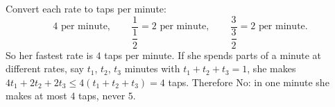 Convert each rate to taps per minute:
\[4\text{ per minute},\qquad \dfrac{1}{\dfrac12}=2\text{ per minute},\qquad \dfrac{3}{\dfrac32}=2\text{ per minute}.\]
So her fastest rate is $4$ taps per minute. If she spends parts of a minute at different rates, say $t_1$, $t_2$, $t_3$ minutes with $t_1+t_2+t_3=1$, she makes $4t_1+2t_2+2t_3\le4(t_1+t_2+t_3)=4$ taps. Therefore $\boxed{\text{No}}$: in one minute she makes at most $4$ taps, never $5$.
